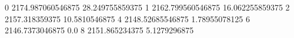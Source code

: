 0 2174.987060546875 28.249755859375
1 2162.799560546875 16.062255859375
2 2157.318359375 10.5810546875
4 2148.52685546875 1.78955078125
6 2146.7373046875 0.0
8 2151.865234375 5.1279296875
